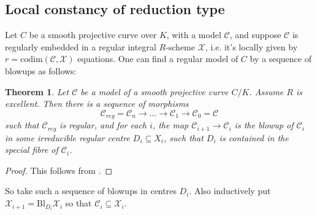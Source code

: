 \documentclass{article}
\theoremstyle{definition}
\theoremstyle{plain}
\newtheorem{thm}[defn]{Theorem}
\theoremstyle{remark}
\newcommand{\bl}{\mathrm{Bl}}
\newcommand{\codim}{\mathrm{codim}}
\begin{document}
	\subsection{Local constancy of reduction type}
	Let $C$ be a smooth projective curve over $K$, with a model $\mathcal{C}$, and suppose $\mathcal{C}$ is regularly embedded in a regular integral $R$-scheme $\mathcal{X}$, i.e. it's locally given by $r = \codim(\mathcal{C}, \mathcal{X})$ equations. One can find a regular model of $C$ by a sequence of blowups as follows:
	\begin{thm}\label{resolution}
		Let $\mathcal{C}$ be a model of a smooth projective curve $C/K$. Assume $R$ is excellent. Then there is a sequence of morphisms
		\[\mathcal{C}_{reg} =\mathcal{C}_n \to \ldots \to \mathcal{C}_1\to \mathcal{C}_0 = \mathcal{C} \]
		such that $\mathcal{C}_{reg}$ is regular, and for each $i$, the map $\mathcal{C}_{i+1}\to \mathcal{C}_i$ is the blowup of $\mathcal{C}_i$ in some irreducible regular centre $D_i\subseteq X_i$, such that $D_i$ is contained in the special fibre of $\mathcal{C}_i$.
	\end{thm}
	\begin{proof}
		This follows from \cite[Theorem 0.1]{cossart2013canonical}.
	\end{proof}
	So take such a sequence of blowups in centres $D_i$. Also inductively put $\mathcal{X}_{i+1} = \bl_{D_i}\mathcal{X}_i$ so that $\mathcal{C}_i \subseteq \mathcal{X}_i$. 
	
\end{document}
